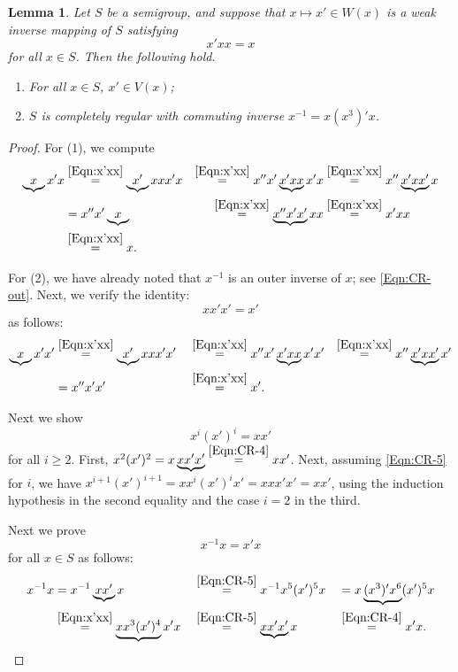 \documentclass[11pt]{article}
\theoremstyle{plain}
\newtheorem{lemma}[theorem]{Lemma}
\theoremstyle{remark}
\theoremstyle{definition}
\theoremstyle{plain}
\newcommand{\byeqn}[1]{\overset{\eqref{#1}}{=}}
\newcommand{\inv}{^{-1}}
\begin{document}
\begin{lemma}\label{Lem:x'xx}
Let $S$ be a semigroup, and suppose that $x\mapsto x'\in W(x)$ is a weak inverse mapping of $S$ satisfying
\begin{equation}\label{Eqn:x'xx}
x'xx = x
\end{equation}
for all $x\in S$. Then the following hold.
\begin{enumerate}
  \item For all $x\in S$, $x'\in V(x)$;
  \item $S$ is completely regular with commuting inverse $x\inv = x(x^3)'x$.
\end{enumerate}
\end{lemma}
\begin{proof}
For (1), we compute
\begin{alignat*}{3}
\underbrace{x}x'x
    &\byeqn{Eqn:x'xx} \underbrace{x'}xxx'x &\byeqn{Eqn:x'xx} x''x'\underbrace{x'xx}x'x &\byeqn{Eqn:x'xx} x''\underbrace{x'xx'}x \\
    &= x''x'\underbrace{x} &\byeqn{Eqn:x'xx} \underbrace{x''x'x'}xx &\byeqn{Eqn:x'xx} x'xx \\
    &\byeqn{Eqn:x'xx} x. & &
\end{alignat*}

For (2), we have already noted that $x\inv$ is an outer inverse of $x$; see \eqref{Eqn:CR-out}.
Next, we verify the identity:
\begin{equation}\label{Eqn:CR-4}
xx'x' = x'
\end{equation}
as follows:
\begin{alignat*}{3}
\underbrace{x}x'x'
    &\byeqn{Eqn:x'xx} \underbrace{x'}xxx'x' &&\byeqn{Eqn:x'xx} x''x'\underbrace{x'xx}x'x' &\byeqn{Eqn:x'xx} x''\underbrace{x'xx'}x' \\
    &= x''x'x' &&\byeqn{Eqn:x'xx} x'. &
\end{alignat*}

Next we show
\begin{equation}\label{Eqn:CR-5}
x^i (x')^i = xx'
\end{equation}
for all $i\ge 2$. First, $x^2(x')^2 = x\underbrace{xx'x'} \byeqn{Eqn:CR-4} xx'$. Next, assuming
\eqref{Eqn:CR-5} for $i$, we have $x^{i+1} (x')^{i+1} = xx^i (x')^i x' = xxx'x' = xx'$, using the
induction hypothesis in the second equality and the case $i=2$ in the third.

Next we prove
\begin{equation}\label{Eqn:CR-6}
x\inv x = x'x
\end{equation}
for all $x\in S$ as follows:
\begin{alignat*}{3}
x\inv x
    &= x\inv\underbrace{xx'}x && \byeqn{Eqn:CR-5} x\inv x^5 (x')^5 x &&= x\underbrace{(x^3)'x^6}(x')^5 x \\
    &\byeqn{Eqn:x'xx} \underbrace{xx^3(x')^4} x'x && \byeqn{Eqn:CR-5} \underbrace{xx'x'}x &&\byeqn{Eqn:CR-4} x'x.
\end{alignat*}


\end{proof}
\end{document}

